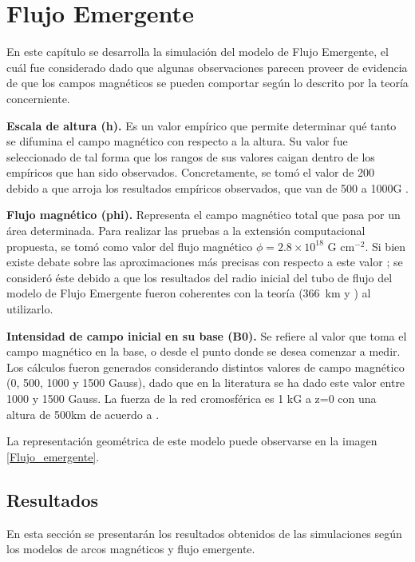 \chapter{Flujo Emergente}

En este cap\'itulo se desarrolla la simulaci\'on del modelo de Flujo Emergente, el cu\'al fue considerado dado que algunas observaciones \citep{flux_reference} parecen proveer de evidencia de que los campos magn\'eticos se pueden comportar seg\'un lo descrito por la teor\'ia concerniente. 

\textbf{Escala de altura (h). }Es un valor emp\'irico que permite determinar qu\'e tanto se difumina el campo magn\'etico con respecto a la altura. Su valor fue seleccionado de tal forma que los rangos de sus valores caigan dentro de los emp\'iricos que han sido observados. Concretamente, se tom\'o el valor de 200 debido a que arroja los resultados emp\'iricos observados, que van de 500 a 1000G \citep{VAULT1}.

\textbf{Flujo magn\'etico (phi). }Representa el campo magn\'etico total que pasa por un \'area determinada. Para realizar las pruebas a la extensi\'on computacional propuesta, se tom\'o como valor del flujo magn\'etico $\phi=2.8 \times 10^{18}$ G cm$^{-2}$. Si bien existe debate sobre las aproximaciones m\'as precisas con respecto a este valor \citep{magneticflux}; se consider\'o \'este debido a que los resultados del radio inicial del tubo de flujo del modelo de Flujo Emergente fueron coherentes con la teor\'ia (366~km \citep{magneticflux} y \citep{VAULT2}) al utilizarlo.

\textbf{Intensidad de campo inicial en su base (B0). }Se refiere al valor que toma el campo magn\'etico en la base, o desde el punto donde se desea comenzar a medir. Los c\'alculos fueron generados considerando distintos valores de campo magn\'etico (0, 500, 1000 y 1500 Gauss), dado que en la literatura se ha dado este valor entre 1000 y 1500 Gauss. La fuerza de la red cromosf\'erica es 1 kG a z=0 con una altura de 500km de acuerdo a \citep{judge}.

La representaci\'on geom\'etrica de este modelo puede observarse en la imagen \ref{Flujo_emergente}.

\clearpage
\section{Resultados}

En esta secci\'on se presentar\'an los resultados obtenidos de las simulaciones seg\'un los modelos de arcos magn\'eticos y flujo emergente.

